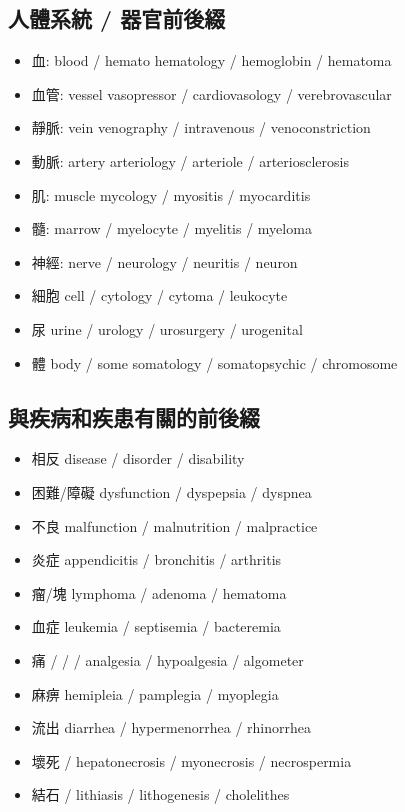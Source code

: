 \subsection{人體系統 / 器官前後綴}
\begin{itemize}
  \itemsep0em
  \item 血: blood  / hemato hematology / hemoglobin / hematoma
  \item 血管: vessel  vasopressor / cardiovasology / verebrovascular
  \item 靜脈: vein  venography / intravenous / venoconstriction
  \item 動脈: artery  arteriology / arteriole / arteriosclerosis
  \item 肌: muscle  mycology / myositis / myocarditis
  \item 髓: marrow  /  myelocyte / myelitis / myeloma
  \item 神經: nerve  /   neurology / neuritis / neuron
  \item 細胞 cell  /  cytology / cytoma / leukocyte
  \item 尿 urine  /  urology / urosurgery / urogenital
  \item 體 body  / some somatology / somatopsychic / chromosome
\end{itemize}

\subsection{與疾病和疾患有關的前後綴}
\begin{itemize}
  \itemsep0em
  \item 相反  disease / disorder / disability 
  \item 困難/障礙  dysfunction / dyspepsia / dyspnea 
  \item 不良  malfunction / malnutrition / malpractice 
  \item 炎症  appendicitis / bronchitis / arthritis 
  \item 瘤/塊  lymphoma / adenoma / hematoma 
  \item 血症  leukemia / septisemia / bacteremia 
  \item 痛  /  /  /  analgesia / hypoalgesia / algometer 
  \item 麻痹  hemipleia / pamplegia / myoplegia 
  \item 流出  diarrhea / hypermenorrhea / rhinorrhea 
  \item 壞死   /  hepatonecrosis / myonecrosis / necrospermia 
  \item 結石  /  lithiasis / lithogenesis / cholelithes
\end{itemize}

